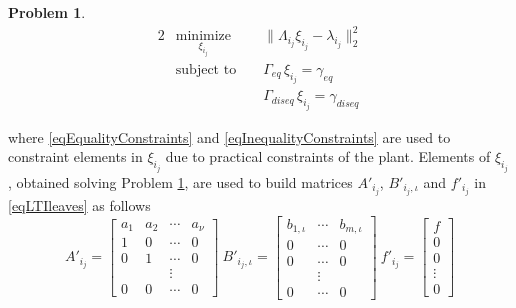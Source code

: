 \documentclass[]{ifacconf}  %
\newtheorem{problem}{Problem}
\begin{document}
\begin{problem}\label{pbLeastSquareProblem}
\small
\begin{alignat}{2}
\nonumber & \underset{\xi_{i_j}}{\text{minimize}} & &  \parallel \Lambda_{i_j} \xi_{i_j}  - \lambda_{i_j} \parallel_2^2            \\
		  & \text{subject to }                    & &  \Gamma_{eq}    \, \xi_{i_j} = \gamma_{eq}\label{eqEqualityConstraints}      \\
		  &                                       & &  \Gamma_{diseq} \, \xi_{i_j} = \gamma_{diseq}\label{eqInequalityConstraints}
\end{alignat}
\normalsize
\end{problem}

where \eqref{eqEqualityConstraints} and \eqref{eqInequalityConstraints} are used to constraint elements in $\xi_{i_j}$ due to practical constraints of the plant. 
Elements of $\xi_{i_j}$, obtained solving Problem \ref{pbLeastSquareProblem}, are used to build matrices $A'_{i_j}$, $B'_{i_j,\iota}$ and $f'_{i_j}$ in \eqref{eqLTIleaves} as follows
\small
\begin{equation}\label{eqLeafModel}
	A'_{i_j}        = \left[\begin{array}{cccc}
							a_1 & a_2 & \cdots & a_\nu \\
							1   & 0   & \cdots & 0     \\
							0   & 1   & \cdots & 0     \\
						    	&     & \vdots &       \\
							0   & 0   & \cdots & 0     
		              \end{array}\right]\ 
	B'_{i_j,\iota}  = \left[\begin{array}{cccc}
							b_{1,\iota} & \cdots & b_{m,\iota} \\
							0           & \cdots & 0           \\
							0           & \cdots & 0           \\
						            	& \vdots &             \\
							0           & \cdots & 0     
		   			  \end{array}\right]\ 
	f'_{i_j}		= \left[\begin{array}{c}
						    f      \\
						    0      \\
						    0      \\
						    \vdots \\
						    0      
					   \end{array}\right]
\end{equation}
\end{document}
